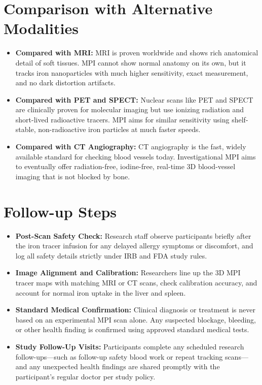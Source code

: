 \section{Comparison with Alternative Modalities}

\begin{itemize}
    \item \textbf{Compared with MRI:} MRI is proven worldwide and shows rich anatomical detail of soft tissues. MPI cannot show normal anatomy on its own, but it tracks iron nanoparticles with much higher sensitivity, exact measurement, and no dark distortion artifacts.
    \item \textbf{Compared with PET and SPECT:} Nuclear scans like PET and SPECT are clinically proven for molecular imaging but use ionizing radiation and short-lived radioactive tracers. MPI aims for similar sensitivity using shelf-stable, non-radioactive iron particles at much faster speeds.
    \item \textbf{Compared with CT Angiography:} CT angiography is the fast, widely available standard for checking blood vessels today. Investigational MPI aims to eventually offer radiation-free, iodine-free, real-time 3D blood-vessel imaging that is not blocked by bone.
\end{itemize}

\section{Follow-up Steps}

\begin{itemize}
    \item \textbf{Post-Scan Safety Check:} Research staff observe participants briefly after the iron tracer infusion for any delayed allergy symptoms or discomfort, and log all safety details strictly under IRB and FDA study rules.
    \item \textbf{Image Alignment and Calibration:} Researchers line up the 3D MPI tracer maps with matching MRI or CT scans, check calibration accuracy, and account for normal iron uptake in the liver and spleen.
    \item \textbf{Standard Medical Confirmation:} Clinical diagnosis or treatment is never based on an experimental MPI scan alone. Any suspected blockage, bleeding, or other health finding is confirmed using approved standard medical tests.
    \item \textbf{Study Follow-Up Visits:} Participants complete any scheduled research follow-ups---such as follow-up safety blood work or repeat tracking scans---and any unexpected health findings are shared promptly with the participant's regular doctor per study policy.
\end{itemize}


